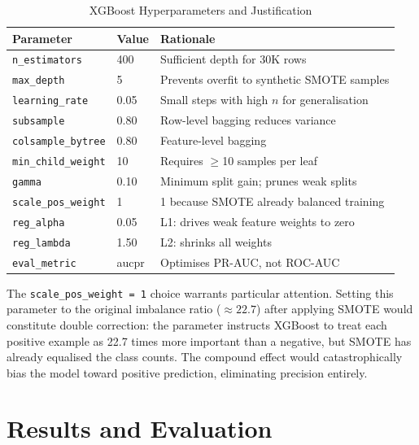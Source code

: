\documentclass[conference]{IEEEtran}
\begin{document}
\begin{table}[H]
\centering
\caption{XGBoost Hyperparameters and Justification}
\label{tab:hyperparams}
\begin{tabular}{@{}lll@{}}
\toprule
Parameter & Value & Rationale \\
\midrule
\texttt{n\_estimators}     & 400   & Sufficient depth for 30K rows \\
\texttt{max\_depth}        & 5     & Prevents overfit to synthetic SMOTE samples \\
\texttt{learning\_rate}    & 0.05  & Small steps with high $n$ for generalisation \\
\texttt{subsample}         & 0.80  & Row-level bagging reduces variance \\
\texttt{colsample\_bytree} & 0.80  & Feature-level bagging \\
\texttt{min\_child\_weight}& 10    & Requires $\geq$10 samples per leaf \\
\texttt{gamma}             & 0.10  & Minimum split gain; prunes weak splits \\
\texttt{scale\_pos\_weight}& 1     & 1 because SMOTE already balanced training \\
\texttt{reg\_alpha}        & 0.05  & L1: drives weak feature weights to zero \\
\texttt{reg\_lambda}       & 1.50  & L2: shrinks all weights \\
\texttt{eval\_metric}      & aucpr & Optimises PR-AUC, not ROC-AUC \\
\bottomrule
\end{tabular}
\end{table}

The \texttt{scale\_pos\_weight = 1} choice warrants particular attention.
Setting this parameter to the original imbalance ratio ($\approx 22.7$)
after applying SMOTE would constitute double correction: the parameter
instructs XGBoost to treat each positive example as 22.7 times more
important than a negative, but SMOTE has already equalised the class
counts. The compound effect would catastrophically bias the model toward
positive prediction, eliminating precision entirely.

\section{Results and Evaluation}
\end{document}
